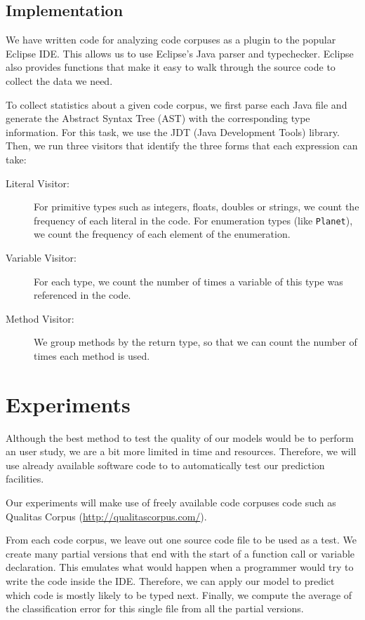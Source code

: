 \documentclass{article} %
\begin{document}
\subsection*{Implementation}

We have written code for analyzing code corpuses as a plugin to the popular Eclipse IDE. This allows us to use Eclipse's Java parser and typechecker. Eclipse also provides functions that make it easy to walk through the source code to collect the data we need.

To collect statistics about a given code corpus, we first parse each Java file and generate the Abstract Syntax Tree (AST) with the corresponding type information. For this task, we use the JDT (Java Development Tools) library. Then, we run three visitors that identify the three forms that each expression can take:

\begin{description}
   \item[Literal Visitor:] For primitive types such as integers, floats, doubles or strings, we count the frequency of each literal in the code. For enumeration types (like \texttt{Planet}), we count the frequency of each element of the enumeration.

   \item[Variable Visitor:] For each type, we count the number of times a variable of this type was referenced in the code.

   \item[Method Visitor:] We group methods by the return type, so that we can count the number of times each method is used.

\end{description}

\section*{Experiments}

Although the best method to test the quality of our models would be to perform an user study, we are a bit more limited in time and resources. Therefore, we will use already available software code to to automatically test our prediction facilities.

Our experiments will make use of freely available code corpuses code such as Qualitas Corpus (\url{http://qualitascorpus.com/}).

From each code corpus, we leave out one source code file to be used as a test.
We create many partial versions that end with the start of a function call or variable declaration. This emulates what would happen when a programmer would try to write the code inside the IDE. Therefore, we can apply our model to predict which code is mostly likely to be typed next. Finally, we compute the average of the classification error for this single file from all the partial versions.
\end{document}
